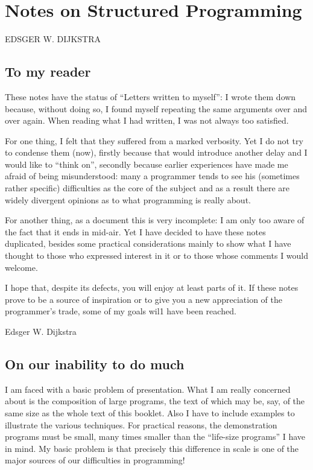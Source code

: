 \chapter{Notes on Structured Programming}

EDSGER W. DIJKSTRA

\section{To my reader}

These notes have the status of ``Letters written to myself'': I wrote them down because, without doing so, I found myself repeating the same arguments over and over again. When reading what I had written, I was not always too satisfied.

For one thing, I felt that they suffered from a marked verbosity. Yet I do not try to condense them (now), firstly because that would introduce another delay and I would like to ``think on'', secondly because earlier experiences have made me afraid of being misunderstood: many a programmer tends to see his (sometimes rather specific) difficulties as the core of the subject and as a result there are widely divergent opinions as to what programming is really about.

For another thing, as a document this is very incomplete: I am only too aware of the fact that it ends in mid-air. Yet I have decided to have these notes duplicated, besides some practical considerations mainly to show what I have thought to those who expressed interest in it or to those whose comments I would welcome.

I hope that, despite its defects, you will enjoy at least parts of it. If these notes prove to be a source of inspiration or to give you a new appreciation of the programmer’s trade, some of my goals wil1 have been reached.
\bigskip

\hfill Edsger W. Dijkstra	


\section{On our inability to do much}

I am faced with a basic problem of presentation. What I am really concerned about is the composition of large programs, the text of which may be, say, of the same size as the whole text of this booklet. Also I have to include examples to illustrate the various techniques. For practical reasons, the demonstration programs must be small, many times smaller than the ``life-size programs'' I have in mind. My basic problem is that precisely this difference in scale is one of the major sources of our difficulties in programming!

